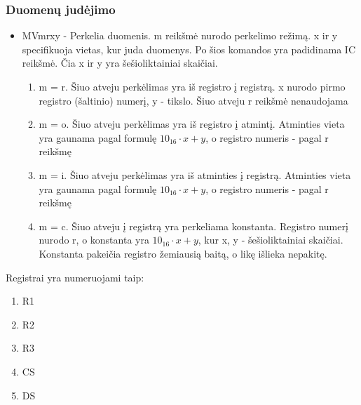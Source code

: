 \documentclass{VUMIFInfKursinis}
\begin{document}
\subsubsection{Duomenų judėjimo}
\begin{itemize}
	\item MVmrxy - Perkelia duomenis. m reikšmė nurodo perkelimo režimą. x ir y specifikuoja vietas, kur juda duomenys. Po šios komandos yra padidinama IC reikšmė. Čia x ir y yra šešioliktainiai skaičiai.
	\begin{enumerate}
		\item m = r. Šiuo atveju perkėlimas yra iš registro į registrą. x nurodo pirmo registro (šaltinio) numerį, y - tikslo. Šiuo atveju r reikšmė nenaudojama
		\item m = o. Šiuo atveju perkėlimas yra iš registro į atmintį. Atminties vieta yra gaunama pagal formulę $10_{16} \cdot x + y$, o registro numeris - pagal r reikšmę
		\item m = i. Šiuo atveju perkėlimas yra iš atminties į registrą. Atminties vieta yra gaunama pagal formulę $10_{16} \cdot x + y$, o registro numeris - pagal r reikšmę
		\item m = c. Šiuo atveju į registrą yra perkeliama konstanta. Registro numerį nurodo r, o konstanta yra $10_{16} \cdot x + y$, kur x, y - šešioliktainiai skaičiai. Konstanta pakeičia registro žemiausią baitą, o likę išlieka nepakitę.
	\end{enumerate}
\end{itemize}


Registrai yra numeruojami taip:
\begin{enumerate}
	\item R1
	\item R2
	\item R3
	\item CS
	\item DS
\end{enumerate}
\end{document}
